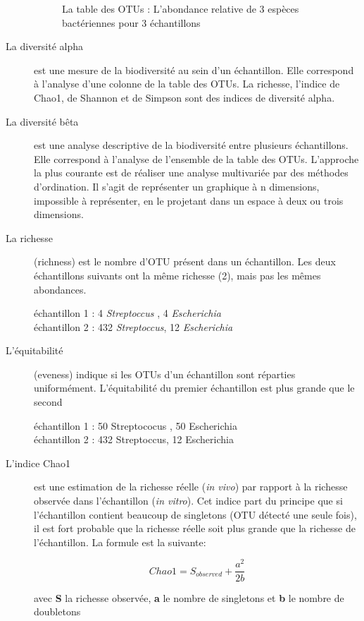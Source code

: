 \documentclass[12pt,a4paper]{article}
\begin{document}
\begin{description}
\begin{figure}[h]
\begin{center}
\begin{tabular}{|l|c|c|c|c}
  \hline
\end{tabular}
\end{center}
\caption{La table des OTUs : L'abondance relative de 3 espèces bactériennes pour 3 échantillons}
\label{OTUTABLE}
\end{figure}

\item[La diversité alpha] est une mesure de la biodiversité au sein d’un échantillon. Elle correspond à l'analyse d'une colonne de la table des OTUs. La richesse, l'indice de Chao1, de Shannon et de Simpson sont des indices de diversité alpha.

\item[La diversité bêta] est une analyse descriptive de la biodiversité entre plusieurs échantillons. Elle correspond à l'analyse de l’ensemble de la table des OTUs. L’approche la plus courante est de réaliser une analyse multivariée par des méthodes d’ordination. Il s’agit de représenter un graphique à n dimensions, impossible à représenter, en le projetant dans un espace à deux ou trois dimensions.

\item[La richesse] (richness) est le nombre d'OTU présent dans un échantillon. Les deux échantillons suivants ont la même richesse (2), mais pas les mêmes abondances.

échantillon 1  : 4 \textit{Streptoccus} , 4 \textit{Escherichia}  \\ 
échantillon 2 : 432 \textit{Streptoccus}, 12 \textit{Escherichia} 

\item[L'équitabilité] (eveness)  indique si les OTUs d’un échantillon sont réparties uniformément.
L'équitabilité du premier échantillon est plus grande que le second

échantillon 1  : 50 Streptococus , 50 Escherichia  \\ 
échantillon 2 : 432 Streptoccus, 12 Escherichia 


\item[L'indice Chao1] est une estimation de la richesse réelle (\textit{in vivo}) par rapport à la richesse observée dans l'échantillon (\textit{in vitro}). Cet indice part du principe que si l’échantillon contient beaucoup de singletons (OTU détecté une seule fois), il est fort probable que la richesse réelle soit plus grande que la richesse de l’échantillon. La formule est la suivante:

\begin{mycapequ}[!h]
   \begin{equation}
     Chao1 = S_{observed} + \frac{a^2}{2b}
   \end{equation}
      \caption{avec \textbf{S} la richesse observée, \textbf{a} le nombre de singletons et \textbf{b} le nombre de doubletons}
\end{mycapequ}


\end{description}
\end{document}
